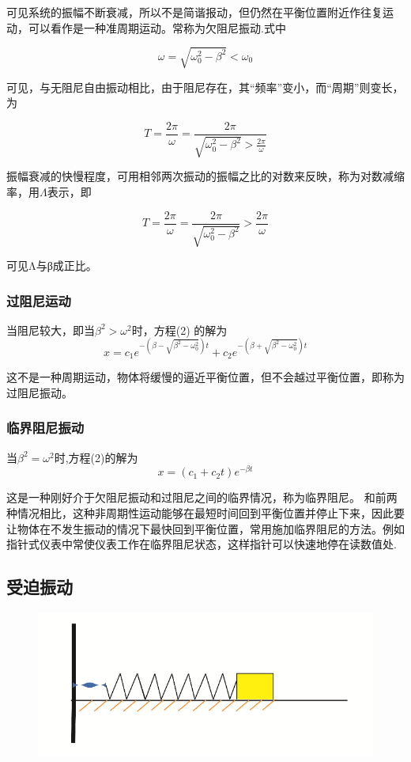 \documentclass[12pt,a4paper]{ctexart}
\begin{document}
	可见系统的振幅不断衰减，所以不是简谐报动，但仍然在平衡位置附近作往复运动，可以看作是一种准周期运动。常称为欠阻尼振动.式中
	
	$$\omega=\sqrt{\omega_0^2-\beta^2}<\omega_0$$
	
	可见，与无阻尼自由振动相比，由于阻尼存在，其“频率”变小，而“周期”则变长，为
	
	$$T=\frac{2\pi}{\omega}=\frac{2\pi}{\sqrt{\omega_0^2-\beta^2}>\frac{2\pi}{\omega}}$$
	
	振幅衰减的快慢程度，可用相邻两次振动的振幅之比的对数来反映，称为对数减缩率，用$\Lambda$表示，即
	
	$$T=\frac{2\pi}{\omega}=\frac{2\pi}{\sqrt{\omega_0^2-\beta^2}}>\frac{2\pi}{\omega}$$
	
	可见Λ与β成正比。
	\subsubsection{过阻尼运动}
	当阻尼较大，即当$\beta^2>\omega^2$时，方程(2) 的解为
	$$x=c_1e^{-(\beta-\sqrt{\beta^2-\omega_0^2})t}+c_2e^{-(\beta+\sqrt{\beta^2-\omega_0^2})t}$$
	
	这不是一种周期运动，物体将缓慢的逼近平衡位置，但不会越过平衡位置，即称为过阻尼振动。
	\subsubsection{临界阻尼振动}
	当$\beta^2=\omega^2$时,方程(2)的解为
	$$x=(c_1+c_2t)e^{-\beta t}$$

	这是一种刚好介于欠阻尼振动和过阻尼之间的临界情况，称为临界阻尼。
	和前两种情况相比，这种非周期性运动能够在最短时间回到平衡位置并停止下来，因此要让物体在不发生振动的情况下最快回到平衡位置，常用施加临界阻尼的方法。例如指针式仪表中常使仪表工作在临界阻尼状态，这样指针可以快速地停在读数值处.
	\subsection{受迫振动}	
	
	
	\begin{figure}[h] %
		\centering %
		\includegraphics[height=8\baselineskip]{T15.png}%
	\end{figure}%
\end{document}
